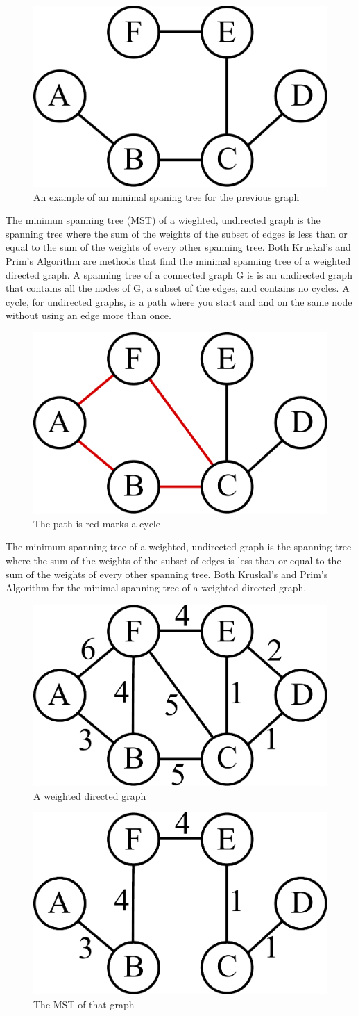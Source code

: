 \begin{figure}[H]
\includegraphics[width = .4\textwidth]{graph2.pdf}
\caption{An example of an minimal spaning tree for the previous graph}
\end{figure}
The minimun spanning tree (MST) of a wieghted, undirected graph is the spanning tree where the sum of the weights of the subset of edges is less than or equal to the sum of the weights of every other spanning tree.
Both Kruskal's and Prim's Algorithm are methods that find the minimal spanning tree of a weighted directed graph.
A spanning tree of a connected graph G is is an undirected graph that contains all the nodes of G, a subset of the edges, and contains no cycles.
A cycle, for undirected graphs, is a path where you start and and on the same node without using an edge more than once. 
\begin{figure}[H]
\includegraphics[width = .4\textwidth]{graph3.pdf}
\caption{The path is red marks a cycle}
\end{figure}
The minimum spanning tree of a weighted, undirected graph is the spanning tree where the sum of the weights of the subset of edges is less than or equal to the sum of the weights of every other spanning tree.
Both Kruskal's and Prim's Algorithm for the minimal spanning tree of a weighted directed graph.
\begin{figure}[H]
\includegraphics[width = .4\textwidth]{graph4.pdf}
\caption{A weighted directed graph}
\end{figure}
\begin{figure}[H]
\includegraphics[width = .4\textwidth]{graph5.pdf}
\caption{The MST of that graph}
\end{figure}

